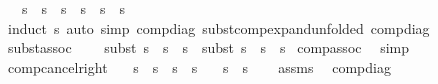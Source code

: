 \begin{isabellebody}
\ \ \ {\isachardoublequoteopen}s{}\ {\isasymbullet}\ {\isacharparenleft}{\kern0pt}s{}\ {\isasymbullet}\ s{}{\isacharparenright}{\kern0pt}\ {\isacharequal}{\kern0pt}\ {\isacharparenleft}{\kern0pt}s{}\ {\isasymbullet}\ s{}{\isacharparenright}{\kern0pt}\ {\isasymbullet}\ s{}{\isachardoublequoteclose}\isanewline
%
\isadelimproof
\ \ %
\endisadelimproof
%
\isatagproof
{}\isamarkupfalse%
\ {\isacharparenleft}{\kern0pt}induct\ s{}{\isacharparenright}{\kern0pt}\ {\isacharparenleft}{\kern0pt}auto\ simp{\isacharcolon}{\kern0pt}\ comp{\isacharunderscore}{\kern0pt}diag\ subst{\isacharunderscore}{\kern0pt}comp{\isacharunderscore}{\kern0pt}expand{\isacharbrackleft}{\kern0pt}unfolded\ comp{\isacharunderscore}{\kern0pt}diag{\isacharbrackright}{\kern0pt}{\isacharparenright}{\kern0pt}%
\endisatagproof
{\isafoldproof}%
%
\isadelimproof
\isanewline
%
\endisadelimproof
\isanewline
{}\isamarkupfalse%
\ subst{\isacharunderscore}{\kern0pt}assoc{\isacharcolon}{\kern0pt}\ \isanewline
\ \ \ {\isachardoublequoteopen}subst\ {\isacharparenleft}{\kern0pt}s{}\ {\isasymbullet}\ {\isacharparenleft}{\kern0pt}s{}\ {\isasymbullet}\ s{}{\isacharparenright}{\kern0pt}{\isacharparenright}{\kern0pt}\ {\isacharequal}{\kern0pt}\ subst\ {\isacharparenleft}{\kern0pt}{\isacharparenleft}{\kern0pt}s{}\ {\isasymbullet}\ s{}{\isacharparenright}{\kern0pt}\ {\isasymbullet}\ s{}{\isacharparenright}{\kern0pt}{\isachardoublequoteclose}\isanewline
%
\isadelimproof
%
\endisadelimproof
%
\isatagproof
{}\isamarkupfalse%
\ comp{\isacharunderscore}{\kern0pt}assoc\ \isamarkupfalse%
\ simp%
\endisatagproof
{\isafoldproof}%
%
\isadelimproof
\isanewline
%
\endisadelimproof
\isanewline
{}\isamarkupfalse%
\ comp{\isacharunderscore}{\kern0pt}cancel{\isacharunderscore}{\kern0pt}right{\isacharcolon}{\kern0pt}\isanewline
\ \ \ {\isachardoublequoteopen}s{}\ {\isasymbullet}\ s\ {\isacharequal}{\kern0pt}\ s{}\ {\isasymbullet}\ s{\isachardoublequoteclose}\isanewline
\ \ \ {\isachardoublequoteopen}s{}\ {\isacharequal}{\kern0pt}\ s{}{\isachardoublequoteclose}\isanewline
%
\isadelimproof
\ \ %
\endisadelimproof
%
\isatagproof
{}\isamarkupfalse%
\ assms\ \isamarkupfalse%
\ comp{\isacharunderscore}{\kern0pt}diag\ \isamarkupfalse%

\end{isabellebody}
